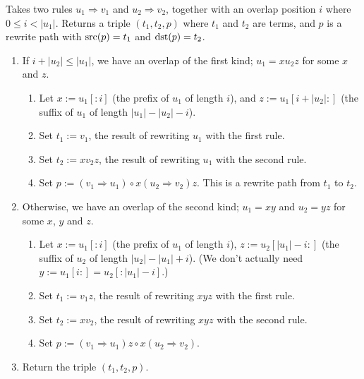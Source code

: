 \documentclass[../generics]{subfiles}
\begin{document}
\begin{algorithm}\label{critical pair algo}
Takes two rules $u_1\Rightarrow v_1$ and $u_2\Rightarrow v_2$, together with an overlap position $i$ where $0\leq i<|u_1|$. Returns a triple $(t_1, t_2, p)$ where $t_1$ and $t_2$ are terms, and $p$ is a rewrite path with $\operatorname{src}(p)=t_1$ and $\operatorname{dst}(p)=t_2$.
\begin{enumerate}
\item If $i+|u_2|\leq|u_1|$, we have an overlap of the first kind; $u_1=xu_2z$ for some $x$ and $z$.
\begin{enumerate}
\item Let $x:=u_1[:i]$ (the prefix of $u_1$ of length $i$), and $z:=u_1[i+|u_2|:]$ (the suffix of $u_1$ of length $|u_1|-|u_2|-i$).
\item Set $t_1:=v_1$, the result of rewriting $u_1$ with the first rule.
\item Set $t_2:=xv_2z$, the result of rewriting $u_1$ with the second rule.
\item Set $p:=(v_1\Rightarrow u_1)\circ x(u_2\Rightarrow v_2)z$. This is a rewrite path from $t_1$ to $t_2$.
\end{enumerate}
\item Otherwise, we have an overlap of the second kind; $u_1=xy$ and $u_2=yz$ for some $x$, $y$ and $z$.
\begin{enumerate}
\item Let $x:=u_1[:i]$ (the prefix of $u_1$ of length $i$), $z:=u_2[|u_1|-i:]$ (the suffix of $u_2$ of length $|u_2|-|u_1|+i$). (We don't actually need $y:=u_1[i:]=u_2[:|u_1|-i]$.)
\item Set $t_1:=v_1z$, the result of rewriting $xyz$ with the first rule.
\item Set $t_2:=xv_2$, the result of rewriting $xyz$ with the second rule.
\item Set $p:=(v_1\Rightarrow u_1)z\circ x(u_2\Rightarrow v_2)$.
\end{enumerate}
\item Return the triple $(t_1, t_2, p)$.
\end{enumerate}
\end{algorithm}
\end{document}
